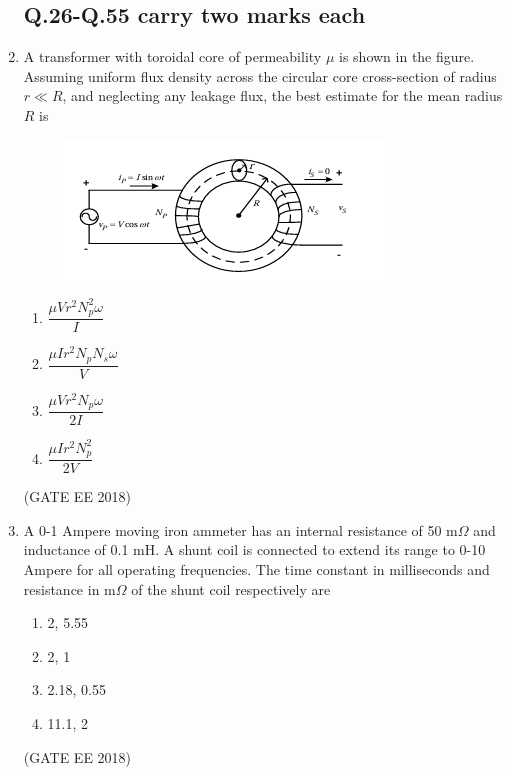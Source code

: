 \documentclass[journal,12pt,onecolumn]{IEEEtran}
\theoremstyle{remark}
\begin{document}
\begin{enumerate}
\subsection{Q.26-Q.55 carry two marks each}
\item A transformer with toroidal core of permeability $\mu$ is shown in the figure. Assuming uniform flux density across the circular core cross-section of radius $r \ll R$, and neglecting any leakage flux, the best estimate for the mean radius $R$ is
\begin{figure}[H]
    \centering
    \includegraphics[]{figs/Q.26.png}
    \caption{}
    \label{fig:8}
\end{figure}
\begin{multicols}{4}
\begin{enumerate}
    \item $\dfrac{\mu V r^2 N_p^2 \omega}{I}$
    \item $\dfrac{\mu I r^2 N_p N_s \omega}{V}$
    \item $\dfrac{\mu V r^2 N_p \omega}{2I}$
    \item $\dfrac{\mu I r^2 N_p^2}{2V}$
\end{enumerate}
\end{multicols}
\hfill{(GATE EE 2018)}

\item A 0-1 Ampere moving iron ammeter has an internal resistance of 50 m$\Omega$ and inductance of 0.1 mH. A shunt coil is connected to extend its range to 0-10 Ampere for all operating frequencies. The time constant in milliseconds and resistance in m$\Omega$ of the shunt coil respectively are
\begin{multicols}{4}
\begin{enumerate}
    \item 2, 5.55
    \item 2, 1
    \item 2.18, 0.55
    \item 11.1, 2
\end{enumerate}
\end{multicols}
\hfill{(GATE EE 2018)}


\end{enumerate}
\end{document}
